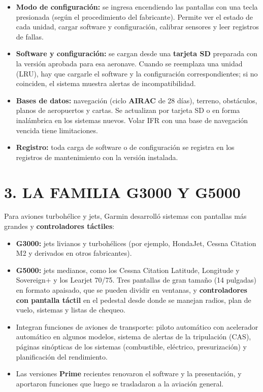 \begin{itemize}
  \item \textbf{Modo de configuración:} se ingresa encendiendo las pantallas con una tecla
        presionada (según el procedimiento del fabricante). Permite ver el estado de cada unidad,
        cargar software y configuración, calibrar sensores y leer registros de fallas.
  \item \textbf{Software y configuración:} se cargan desde una \textbf{tarjeta SD} preparada con la
        versión aprobada para esa aeronave. Cuando se reemplaza una unidad (LRU), hay que cargarle
        el software y la configuración correspondientes; si no coinciden, el sistema muestra
        alertas de incompatibilidad.
  \item \textbf{Bases de datos:} navegación (ciclo \textbf{AIRAC} de 28 días), terreno, obstáculos,
        planos de aeropuertos y cartas. Se actualizan por tarjeta SD o en forma inalámbrica en los
        sistemas nuevos. Volar IFR con una base de navegación vencida tiene limitaciones.
  \item \textbf{Registro:} toda carga de software o de configuración se registra en los registros
        de mantenimiento con la versión instalada.
\end{itemize}

\section*{3. LA FAMILIA G3000 Y G5000}

Para aviones turbohélice y jets, Garmin desarrolló sistemas con pantallas más grandes y
\textbf{controladores táctiles}:
\begin{itemize}
  \item \textbf{G3000:} jets livianos y turbohélices (por ejemplo, HondaJet, Cessna Citation M2 y
        derivados en otros fabricantes).
  \item \textbf{G5000:} jets medianos, como los Cessna Citation Latitude, Longitude y Sovereign+ y
        los Learjet 70/75. Tres pantallas de gran tamaño (14 pulgadas) en formato apaisado, que se
        pueden dividir en ventanas, y \textbf{controladores con pantalla táctil} en el pedestal desde
        donde se manejan radios, plan de vuelo, sistemas y listas de chequeo.
  \item Integran funciones de aviones de transporte: piloto automático con acelerador automático en
        algunos modelos, sistema de alertas de la tripulación (CAS), páginas sinópticas de los
        sistemas (combustible, eléctrico, presurización) y planificación del rendimiento.
  \item Las versiones \textbf{Prime} recientes renovaron el software y la presentación, y aportaron
        funciones que luego se trasladaron a la aviación general.
\end{itemize}

